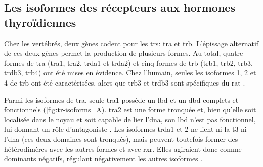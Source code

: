 \documentclass[../main.tex]{subfiles}
\begin{document}

	\subsection{Les isoformes des récepteurs aux hormones thyroïdiennes}
		Chez les vertébrés, deux gènes codent pour les \glspl{tr}: \gls{tra} et \gls{trb}.
		L'épissage alternatif de ces deux gènes permet la production de plusieurs formes.
		Au total, quatre formes de \gls{tra} (\gls{tra}1, \gls{tra}2, \gls{trda}1 et \gls{trda}2) et cinq formes de \gls{trb} (\gls{trb}1, \gls{trb}2, \gls{trb}3, \gls{trdb}3, \gls{trb}4) ont été mises en évidence.
		Chez l'humain, seules les isoformes 1, 2 et 4 de \gls{trb} ont été caractérisées, alors que \gls{trb}3 et \gls{trdb}3 sont spécifiques du rat \citep{Williams2000}.


		Parmi les isoformes de \gls{tra}, seule \gls{tra}1 possède un \gls{lbd} et un \gls{dbd} complets et fonctionnels (\autoref{fig:tr-isoforms}~A).
		\gls{tra}2 est une forme tronquée et, bien qu'elle soit localisée dans le noyau et soit capable de lier l'\gls{dna}, son \gls{lbd} n'est pas fonctionnel, lui donnant un rôle d'antagoniste \citep{Chassande1997}.
		Les isoformes \gls{trda}1 et 2 ne lient ni la \gls{t3} ni l'\gls{dna} (ces deux domaines sont tronqués), mais peuvent toutefois former des hétérodimères avec les autres formes et avec \gls{rxr}.
		Elles agiraient donc comme dominants négatifs, régulant négativement les autres isoformes \citep{Plateroti2001}.

		
\end{document}
